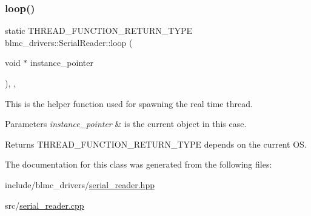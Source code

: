 \subsubsection{\texorpdfstring{loop()}{loop()}}
{\footnotesize\ttfamily static T\+H\+R\+E\+A\+D\+\_\+\+F\+U\+N\+C\+T\+I\+O\+N\+\_\+\+R\+E\+T\+U\+R\+N\+\_\+\+T\+Y\+PE blmc\+\_\+drivers\+::\+Serial\+Reader\+::loop (\begin{DoxyParamCaption}\item[{void $\ast$}]{instance\+\_\+pointer }\end{DoxyParamCaption})\hspace{0.3cm}{\ttfamily [inline]}, {\ttfamily [static]}, {\ttfamily [private]}}



This is the helper function used for spawning the real time thread. 


\begin{DoxyParams}{Parameters}
{\em instance\+\_\+pointer} & is the current object in this case. \\
\hline
\end{DoxyParams}
\begin{DoxyReturn}{Returns}
T\+H\+R\+E\+A\+D\+\_\+\+F\+U\+N\+C\+T\+I\+O\+N\+\_\+\+R\+E\+T\+U\+R\+N\+\_\+\+T\+Y\+PE depends on the current OS. 
\end{DoxyReturn}


The documentation for this class was generated from the following files\+:\begin{DoxyCompactItemize}
\item 
include/blmc\+\_\+drivers/\hyperlink{serial__reader_8hpp}{serial\+\_\+reader.\+hpp}\item 
src/\hyperlink{serial__reader_8cpp}{serial\+\_\+reader.\+cpp}\end{DoxyCompactItemize}

